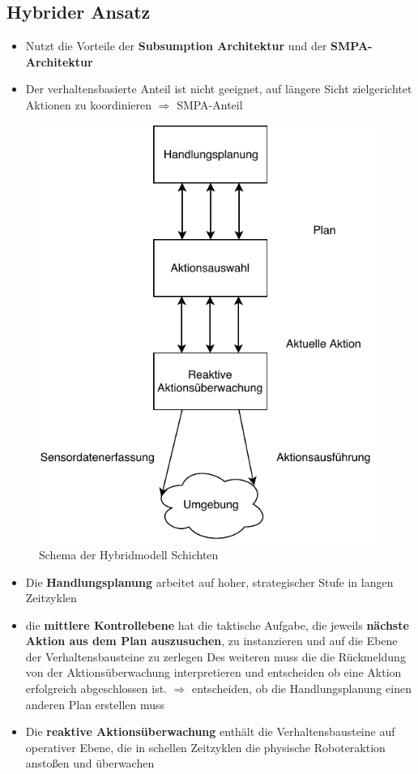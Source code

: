 \subsection{Hybrider Ansatz}
\begin{itemize}
	\item Nutzt die Vorteile der \textbf{Subsumption Architektur} und der \textbf{SMPA-Architektur}
	\item Der verhaltensbasierte Anteil ist nicht geeignet, auf längere Sicht zielgerichtet Aktionen zu koordinieren $\Rightarrow$ SMPA-Anteil
\end{itemize}
\begin{figure}[H]
	\begin{center}
		\includegraphics[scale=0.9]{Resources/PDF/HybridModel}
		\caption{Schema der Hybridmodell Schichten}
		\label{fig:PDF/HybridModel}
	\end{center}
\end{figure}
\begin{itemize}
	\item Die \textbf{Handlungsplanung} arbeitet auf hoher, strategischer Stufe in langen Zeitzyklen
	\item die \textbf{mittlere Kontrollebene} hat die taktische Aufgabe, die jeweils \textbf{nächste Aktion aus dem Plan auszusuchen}, zu instanzieren und auf die Ebene der Verhaltensbausteine zu zerlegen
	Des weiteren muss die die Rückmeldung von der Aktionsüberwachung interpretieren und entscheiden ob eine Aktion erfolgreich abgeschlossen ist. $\Rightarrow$ entscheiden, ob die Handlungsplanung einen anderen Plan erstellen muss
	\item Die \textbf{reaktive Aktionsüberwachung} enthält die Verhaltensbausteine auf operativer Ebene, die in schellen Zeitzyklen die physische Roboteraktion anstoßen und überwachen
\end{itemize}
